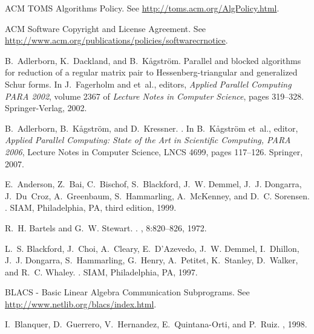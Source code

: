 \documentclass[11pt]{article}
\begin{document}
{\small

%
\begin{thebibliography}{10}

{ACM TOMS Algorithms Policy}.
\newblock See \url{http://toms.acm.org/AlgPolicy.html}.

{ACM Software Copyright and License Agreement}.
\newblock See \url{http://www.acm.org/publications/policies/softwarecrnotice}.

B.~Adlerborn, K.~Dackland, and B.~K\r{a}gstr\"om.
\newblock Parallel and blocked algorithms for reduction of a regular matrix
  pair to {H}essenberg-triangular and generalized {S}chur forms.
\newblock In J.~Fagerholm and et~al., editors, {\em Applied Parallel Computing
  PARA 2002}, volume 2367 of {\em Lecture Notes in Computer Science}, pages
  319--328. Springer-Verlag, 2002.

B.~Adlerborn, B.~K\r{a}gstr\"om, and D.~Kressner.
.
\newblock In B.~K\r{a}gstr\"om et~al., editor, {\em Applied Parallel Computing:
  State of the Art in Scientific Computing, PARA 2006}, Lecture Notes in
  Computer Science, LNCS 4699, pages 117--126. Springer, 2007.

E.~Anderson, Z.~Bai, C.~Bischof, S.~Blackford, J.~W. Demmel, J.~J. Dongarra,
  J.~Du~Croz, A.~Greenbaum, S.~Hammarling, A.~McKenney, and D.~C. Sorensen.
.
\newblock SIAM, Philadelphia, PA, third edition, 1999.

R.~H. Bartels and G.~W. Stewart.
.
, 8:820--826, 1972.

L.~S. Blackford, J.~Choi, A.~Cleary, E.~D'Azevedo, J.~W. Demmel, I.~Dhillon,
  J.~J. Dongarra, S.~Hammarling, G.~Henry, A.~Petitet, K.~Stanley, D.~Walker,
  and R.~C. Whaley.
.
\newblock SIAM, Philadelphia, PA, 1997.

{BLACS - Basic Linear Algebra Communication Subprograms}.
\newblock See \url{http://www.netlib.org/blacs/index.html}.

I.~Blanquer, D.~Guerrero, V.~Hernandez, E.~Quintana-Orti, and P.~Ruiz.
, 1998.


\end{thebibliography}}
\end{document}

